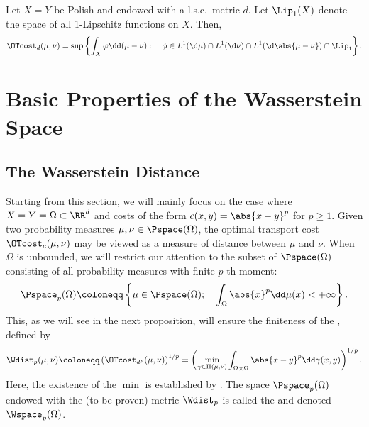 \documentclass[oneside,reqno,letterpaper]{amsart}
\begin{document}
\begin{theorem}\label{prop:Kan-Rub}
  Let \(X = Y\) be Polish and endowed with a l.s.c.\ metric \(d\).
  Let \(\Lip_1(X)\) denote the space of all 1-Lipschitz functions on \(X\).
  Then,
  \[
    \OTcost_d(\mu, \nu)
    = \sup\left\{ \int_X \varphi \dd (\mu - \nu): \quad \phi \in L^1(\d \mu) \cap L^1(\d \nu) \cap L^1(\d \abs{\mu - \nu}) \cap \Lip_1 \right\}.
  \]
\end{theorem}




\section{Basic Properties of the Wasserstein Space}
\subsection{The Wasserstein Distance}
Starting from this section, we will mainly focus on the case where \(X = Y = \Omega \subset \RR^d\) and costs of the form \(c(x, y) = \abs{x - y}^p\) for \(p \geq 1\).
Given two probability measures \(\mu, \nu \in \Pspace(\Omega)\), the optimal transport cost \(\OTcost_c(\mu, \nu)\) may be viewed as a measure of distance between \(\mu\) and \(\nu\).
When \(\Omega\) is unbounded, we will restrict our attention to the subset of \(\Pspace(\Omega)\) consisting of all probability measures with finite \(p\)-th moment:
\[
  \Pspace_p(\Omega) \coloneqq \left\{ \mu \in \Pspace(\Omega); \quad \int_{\Omega} \abs{x}^p \dd \mu(x) < +\infty \right\}.
\]
This, as we will see in the next proposition, will ensure the finiteness of the , defined by
\[
  \Wdist_p(\mu, \nu)
  \coloneqq \left( \OTcost_{d^p}(\mu, \nu) \right)^{1/p}
  = \left( \min_{\gamma \in \Pi(\mu, \nu)} \int_{\Omega \times \Omega} \abs{x - y}^p \dd \gamma(x, y) \right)^{1/p}.
\]
Here, the existence of the \(\min\) is established by .
The space \(\Pspace_p(\Omega)\) endowed with the (to be proven) metric \(\Wdist_p\) is called the  and denoted \(\Wspace_p(\Omega)\).
\end{document}
